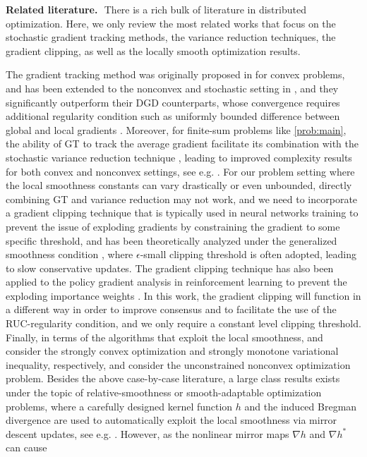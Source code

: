 \documentclass{article}
\begin{document}
  






\noindent\textbf{\large Related literature.}$\,\,$ There is a rich bulk of literature in distributed optimization. Here, we only review the most related works that focus on the stochastic gradient tracking methods, the variance reduction techniques, the gradient clipping, as well as the locally smooth optimization results. 

The gradient tracking method was originally proposed in \cite{nedic2017achieving} for convex problems, and has been extended to the nonconvex and stochastic setting in \cite{zhang2019decentralized,lu2019gnsd,koloskova2021improved,pu2021distributed}, and they significantly outperform their DGD counterparts, whose convergence requires additional regularity condition such as uniformly bounded difference between global and local gradients \cite{lian2017can,assran2019stochastic}. Moreover, for finite-sum problems like \eqref{prob:main}, the ability of GT to track the average gradient facilitate its combination with the stochastic variance reduction technique \cite{johnson2013accelerating,defazio2014saga,pham2020proxsarah,cutkosky2019momentum}, leading to improved complexity results for both convex and nonconvex settings, see e.g. \cite{li2020communication,sun2020improving,xin2020general,xin2020variance,xin2021fast,jiang2022distributed}. For our problem setting where the local smoothness constants can vary drastically or even unbounded, directly combining GT and variance reduction may not work, and we need to incorporate a gradient clipping technique that is typically used in  neural networks training to prevent the issue of exploding gradients by constraining the gradient to some specific threshold, and has been theoretically analyzed under the generalized smoothness condition \cite[etc.]{zhang2019gradient,koloskova2023revisiting,li2023convex}, where $\epsilon$-small clipping threshold is often adopted, leading to slow conservative updates. The gradient clipping technique has also been applied to the policy gradient analysis in reinforcement learning to prevent the exploding importance weights \cite{zhang2021convergence}. In this work, the gradient clipping will function in a different way in order to improve consensus and to facilitate the use of the RUC-regularity condition, and we only require a constant level clipping threshold. Finally, in terms of the algorithms that exploit the local smoothness, \cite{lu2023accelerated} and \cite{lu2024primal} consider the strongly convex optimization and strongly monotone variational inequality, respectively, and \cite{zhang2024first,hong2020diverge} consider the unconstrained nonconvex optimization problem. Besides the above case-by-case literature, a large class results exists under the topic of relative-smoothness \cite{lu2018relatively} or smooth-adaptable \cite{bauschke2017descent} optimization problems, where a carefully designed kernel function $h$ and the induced Bregman divergence are used to automatically exploit the local smoothness via mirror descent updates, see e.g. \cite{bolte2018first,teboulle2018simplified}. However, as the nonlinear mirror maps $\nabla h$ and $\nabla h^*$ can cause 
\end{document}
